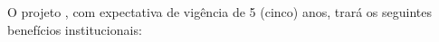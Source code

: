 
O projeto \emph{\tituloprojeto}, com expectativa de vigência de 5 (cinco) anos, trará os seguintes benefícios institucionais:
